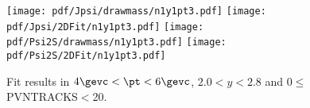 \begin{figure}[H]
\begin{center}
\texttt{[image: pdf/Jpsi/drawmass/n1y1pt3.pdf]}
\texttt{[image: pdf/Jpsi/2DFit/n1y1pt3.pdf]}
\vspace*{-0.5cm}
\texttt{[image: pdf/Psi2S/drawmass/n1y1pt3.pdf]}
\texttt{[image: pdf/Psi2S/2DFit/n1y1pt3.pdf]}
\vspace*{-0.5cm}
\end{center}
\caption{Fit results in $4\gevc<\pt<6\gevc$, $2.0<y<2.8$ and 0$\leq$PVNTRACKS$<$20.}
\label{Fitn1y1pt3}
\end{figure}
